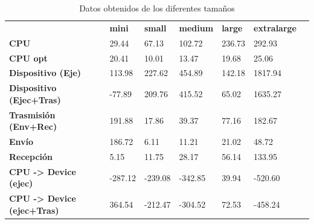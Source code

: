 \begin{table}[H]
    \centering
    \begin{tabular}{lllllll}
    \rowcolor[HTML]{DAE8FC} \ &  \textbf{mini} &  \textbf{small} &  \textbf{medium} &  \textbf{	large} &  \textbf{	extralarge} \\
    \cellcolor[HTML]{DAE8FC} \textbf{CPU} & 29.44 & 67.13 & 102.72 & 	236.73 & 	292.93 \\
    \rowcolor[HTML]{EFEFEF} \cellcolor[HTML]{DAE8FC} \textbf{CPU opt} & 20.41 & 10.01 & 13.47 & 	19.68 & 	25.06 \\
    \cellcolor[HTML]{DAE8FC} \textbf{Dispositivo (Eje)} & 113.98 & 227.62 & 454.89 & 	142.18 & 	1817.94 \\
    \rowcolor[HTML]{EFEFEF} \cellcolor[HTML]{DAE8FC} \textbf{Dispositivo (Ejec+Tras)} & -77.89 & 209.76 & 415.52 & 	65.02 & 	1635.27 \\
    \cellcolor[HTML]{DAE8FC} \textbf{Trasmisión (Env+Rec)} & 191.88 & 17.86 & 39.37 & 	77.16 & 	182.67 \\
    \rowcolor[HTML]{EFEFEF} \cellcolor[HTML]{DAE8FC} \textbf{Envío} & 186.72 & 6.11 & 11.21 & 	21.02 & 	48.72 \\
    \cellcolor[HTML]{DAE8FC} \textbf{Recepción} & 5.15 & 11.75 & 28.17 & 	56.14 & 	133.95 \\
    \rowcolor[HTML]{EFEFEF} \cellcolor[HTML]{DAE8FC} \textbf{CPU -> Device (ejec)} & -287.12 & -239.08 & -342.85 & 	39.94 & 	-520.60 \\
    \cellcolor[HTML]{DAE8FC} \textbf{CPU -> Device (ejec+Tras)} & 364.54 & -212.47 & -304.52 & 	72.53 & 	-458.24 \\
    \end{tabular}
    \caption[Datos obtenidos de los diferentes tamaños]{Datos obtenidos de los diferentes tamaños}
    \label{table_test_vectorAdd_Opt0_hw_performanceResults}
\end{table}